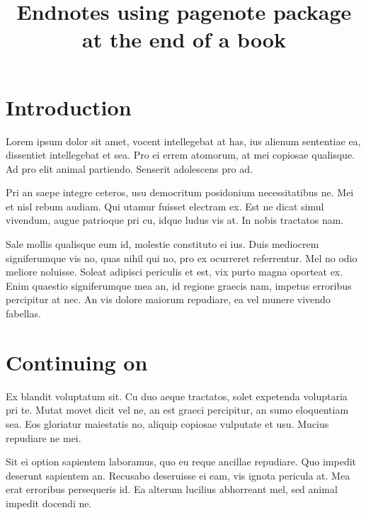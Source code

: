 \documentclass[11pt,openany]{book}
\title{Endnotes using pagenote package at the end of a book}
\begin{document}
\chapter{Introduction}

Lorem ipsum dolor sit amet, vocent intellegebat at has, ius alienum sententiae ea, dissentiet intellegebat et sea. Pro ei errem atomorum, at mei copiosae qualisque. Ad pro elit animal partiendo. Senserit adolescens pro ad.

Pri an saepe integre ceteros, usu democritum posidonium necessitatibus ne. Mei et nisl rebum audiam. Qui utamur fuisset electram ex. Est ne dicat simul vivendum, augue patrioque pri cu, idque ludus vis at. In nobis tractatos nam.

Sale mollis qualisque eum id, molestie constituto ei ius. Duis mediocrem signiferumque vis no, quas nihil qui no, pro ex ocurreret referrentur. Mel no odio meliore noluisse. Soleat adipisci periculis et est, vix purto magna oporteat ex. Enim quaestio signiferumque mea an, id regione graecis nam, impetus erroribus percipitur at nec. An vis dolore maiorum repudiare, ea vel munere vivendo fabellas.


\chapter{Continuing on}

Ex blandit voluptatum sit. Cu duo aeque tractatos, solet expetenda voluptaria pri te. Mutat movet dicit vel ne, an est graeci percipitur, an sumo eloquentiam sea. Eos gloriatur maiestatis no, aliquip copiosae vulputate et usu. Mucius repudiare ne mei.

Sit ei option sapientem laboramus, quo eu reque ancillae repudiare. Quo impedit deserunt sapientem an. Recusabo deseruisse ei eam, vis ignota pericula at. Mea erat erroribus persequeris id. Ea alterum lucilius abhorreant mel, sed animal impedit docendi ne.


\appendix %
\printnotes*
\end{document}
